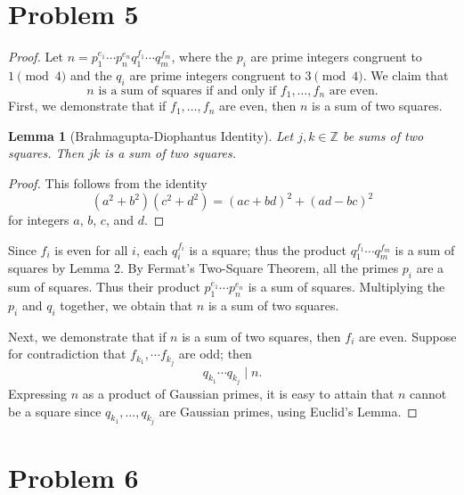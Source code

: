 \documentclass[11pt]{article}
\newtheorem{lemma}{Lemma}
\begin{document}
\section{Problem 5}
\begin{proof}
  Let $n = p_{1}^{e_{1}} \cdots p_{n}^{e_{n}} q_{1}^{f_{1}} \cdots q_{m}^{f_{m}}$, where the $p_{i}$ are prime integers congruent to $1 \pmod{4}$ and the $q_{i}$ are prime integers congruent to $3 \pmod{4}$. We claim that
  \[
    \boxed{\text{$n$ is a sum of squares if and only if $f_{1}, \ldots, f_{n}$ are even}}.
  \]
  First, we demonstrate that if $f_{1}, \ldots, f_{n}$ are even, then $n$ is a sum of two squares.
  
  \begin{adjustwidth}{0.5cm}{}
    \begin{lemma}[Brahmagupta-Diophantus Identity]
      Let $j, k \in \mathbb{Z}$ be sums of two squares. Then $jk$ is a sum of two squares.
    \end{lemma}
    \begin{proof}
      This follows from the identity
      \[
        (a^{2} + b^{2})(c^{2} + d^{2}) = (ac + bd)^{2} + (ad - bc)^{2}
      \]
      for integers $a$, $b$, $c$, and $d$.
    \end{proof}
  \end{adjustwidth}
  Since $f_{i}$ is even for all $i$, each $q_{i}^{f_{i}}$ is a square; thus the product $q_{1}^{f_{1}} \cdots q_{m}^{f_{m}}$ is a sum of squares by Lemma 2. By Fermat's Two-Square Theorem, all the primes $p_{i}$ are a sum of squares. Thus their product $p_{1}^{e_{1}} \cdots p_{n}^{e_{n}}$ is a sum of squares. Multiplying the $p_{i}$ and $q_{i}$ together, we obtain that $n$ is a sum of two squares.
  
  Next, we demonstrate that if $n$ is a sum of two squares, then $f_{i}$ are even. Suppose for contradiction that $f_{k_{1}}, \cdots f_{k_{j}}$ are odd; then
  \[
    q_{k_{1}} \cdots q_{k_{j}} \mid n.
  \]
  Expressing $n$ as a product of Gaussian primes, it is easy to attain that $n$ cannot be a square since $q_{k_{1}}, \ldots, q_{k_{j}}$ are Gaussian primes, using Euclid's Lemma.
\end{proof}


\section{Problem 6}

\end{document}
